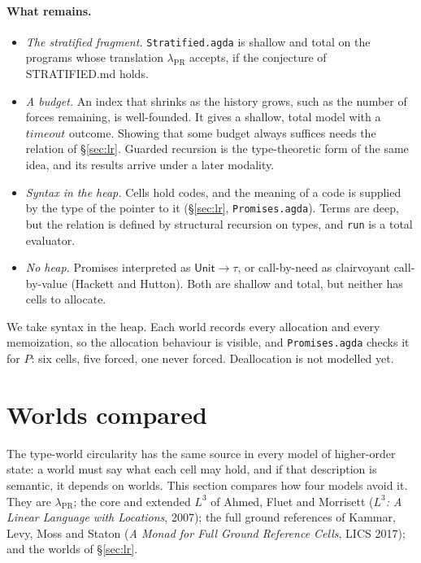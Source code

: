 \documentclass[11pt]{article}
\newcommand{\Unit}{\mathsf{Unit}}
\begin{document}
\paragraph{What remains.}
\begin{itemize}
  \item \emph{The stratified fragment.} \texttt{Stratified.agda} is shallow
    and total on the programs whose translation $\lambda_{\mathrm{PR}}$
    accepts, if the conjecture of STRATIFIED.md holds.
  \item \emph{A budget.} An index that shrinks as the history grows, such as
    the number of forces remaining, is well-founded. It gives a shallow,
    total model with a $\mathit{timeout}$ outcome. Showing that some budget
    always suffices needs the relation of \S\ref{sec:lr}. Guarded recursion
    is the type-theoretic form of the same idea, and its results arrive
    under a later modality.
  \item \emph{Syntax in the heap.} Cells hold codes, and the meaning of a code
    is supplied by the type of the pointer to it (\S\ref{sec:lr},
    \texttt{Promises.agda}). Terms are deep, but the relation is defined by
    structural recursion on types, and \texttt{run} is a total evaluator.
  \item \emph{No heap.} Promises interpreted as $\Unit \to \tau$, or
    call-by-need as clairvoyant call-by-value (Hackett and Hutton). Both are
    shallow and total, but neither has cells to allocate.
\end{itemize}
We take syntax in the heap. Each world records every allocation and every
memoization, so the allocation behaviour is visible, and
\texttt{Promises.agda} checks it for $P$: six cells, five forced, one never
forced. Deallocation is not modelled yet.

\section{Worlds compared}
\label{sec:worlds}

The type-world circularity has the same source in every model of
higher-order state: a world must say what each cell may hold, and if that
description is semantic, it depends on worlds. This section compares how
four models avoid it. They are $\lambda_{\mathrm{PR}}$; the core and extended
$L^3$ of Ahmed, Fluet and Morrisett (\emph{$L^3$: A Linear Language with
Locations}, 2007); the full ground references of Kammar, Levy, Moss and
Staton (\emph{A Monad for Full Ground Reference Cells}, LICS 2017); and the
worlds of \S\ref{sec:lr}.
\end{document}

